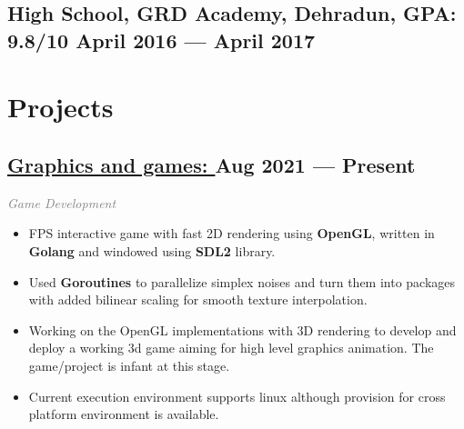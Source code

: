 \documentclass[a4,10pt]{article}
\def\gray#1{\textcolor{gray}{#1}}
\newenvironment{zitemize}{
\begin{itemize}\itemsep0pt \parskip0pt \parsep1pt}
{\end{itemize}\vspace{-0.5cm}}
\begin{document}
\subsection*{High School, {\normalsize \normalfont GRD Academy, Dehradun, GPA: 9.8/10 } \hfill April 2016 --- April 2017} 
\vspace{0.2cm}



\section{Projects} 

\subsection*{\href{https://github.com/Sigsev-Dev/graphics}{Graphics and games: } \hfill Aug 2021 --- Present} 
\vspace{-0.05cm}
{\normalsize \normalfont \emph{\gray{Game Development}}}
\vspace{-0.25cm}
    \begin{zitemize}
        \item FPS interactive game with fast 2D rendering using \textbf{OpenGL}, written in \textbf{Golang} and windowed using \textbf{SDL2} library. 
        \item Used \textbf{Goroutines} to parallelize simplex noises and turn them into packages with added bilinear scaling for smooth texture interpolation.
        \item Working on the OpenGL implementations with 3D rendering to develop and deploy a working 3d game aiming for high level graphics animation. The game/project is infant at this stage. 
        \item Current execution environment supports linux although provision for cross platform environment is available.
    \end{zitemize}


\end{document}
